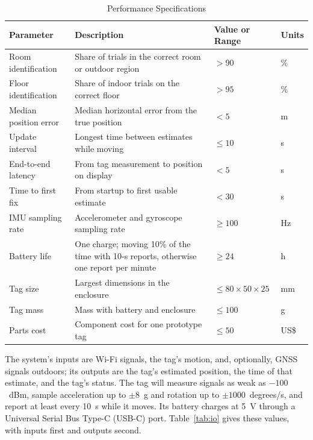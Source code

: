 \documentclass[12pt,letterpaper]{article}
\newenvironment{spectable}{\setstretch{1.0}\renewcommand{\arraystretch}{1.1}}{}
\begin{document}
\begin{table}[!htb]
\caption{Performance Specifications}
\label{tab:perf}
\centering
\begin{spectable}
\begin{tabularx}{\linewidth}{@{}L{1.55in} Y L{0.95in} L{0.5in}@{}}
\toprule
\textbf{Parameter} & \textbf{Description} & \textbf{Value or Range} & \textbf{Units} \\
\midrule
Room identification & Share of trials in the correct room or outdoor region & $>90$ & \% \\
Floor identification & Share of indoor trials on the correct floor & $>95$ & \% \\
Median position error & Median horizontal error from the true position & $<5$ & m \\
Update interval & Longest time between estimates while moving & $\leq 10$ & s \\
End-to-end latency & From tag measurement to position on display & $<5$ & s \\
Time to first fix & From startup to first usable estimate & $<30$ & s \\
IMU sampling rate & Accelerometer and gyroscope sampling rate & $\geq 100$ & Hz \\
Battery life & One charge; moving 10\% of the time with 10-s reports, otherwise one report per minute & $\geq 24$ & h \\
Tag size & Largest dimensions in the enclosure & $\leq 80 \times 50 \times 25$ & mm \\
Tag mass & Mass with battery and enclosure & $\leq 100$ & g \\
Parts cost & Component cost for one prototype tag & $\leq 50$ & US\$ \\
\bottomrule
\end{tabularx}
\end{spectable}
\end{table}

The system's inputs are Wi-Fi signals, the tag's motion, and, optionally, GNSS signals outdoors; its
outputs are the tag's estimated position, the time of that estimate, and the tag's status. The tag
will measure signals as weak as $-100$~dBm, sample acceleration up to $\pm 8$~g and rotation up to
$\pm 1000$~degrees/s, and report at least every 10~s while it moves. Its battery charges at 5~V
through a Universal Serial Bus Type-C (USB-C) port. Table~\ref{tab:io} gives these values, with
inputs first and outputs second.
\end{document}
